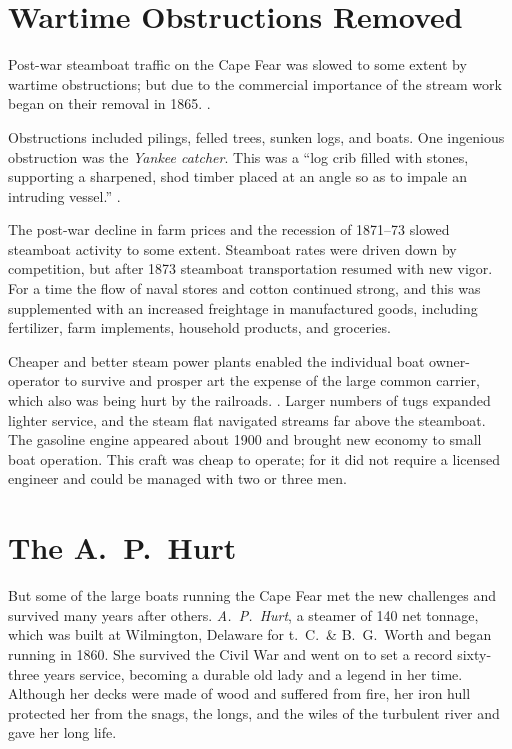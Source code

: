 \documentclass[11pt, a5paper, openright]{book}
\newcommand{\steamer}[1]{\textit{#1}\index{#1,~steamer}}
\newcommand{\steamerco}[1]{#1\index{#1}}
\begin{document}
\section{Wartime Obstructions Removed}

Post-war steamboat traffic on the Cape Fear was slowed to some extent
by wartime obstructions; but due to the commercial importance of the
stream work began on their removal in 1865.
\citep[5-2-1865]{whu}.\par

Obstructions included pilings, felled trees, sunken logs, and boats.
One ingenious obstruction was the \textit{Yankee catcher}.  This was a
``log crib filled with stones, supporting a sharpened, shod timber
placed at an angle so as to impale an intruding vessel.''
\citep[55-56]{sloanth}.\par

The post-war decline in farm prices and the recession of 1871--73
slowed steamboat activity to some extent.  Steamboat rates were driven
down by competition, but after 1873 steamboat transportation resumed
with new vigor.  For a time the flow of naval stores and cotton
continued strong, and this was supplemented with an increased
freightage in manufactured goods, including fertilizer, farm
implements, household products, and groceries.\par

Cheaper and better steam power plants enabled the individual boat
owner-operator to survive and prosper art the expense of the large
common carrier, which also was being hurt by the railroads.
\citep[65]{sloanth}.  Larger numbers of tugs expanded lighter service,
and the steam flat navigated streams far above the steamboat.  The
gasoline engine appeared about 1900 and brought new economy to small
boat operation.  This craft was cheap to operate; for it did not
require a licensed engineer and could be managed with two or three
men.\par

\section{The A.~P.~Hurt}

But some of the large boats running the Cape Fear met the new
challenges and survived many years after others.
\steamer{A.~P.~Hurt}, a steamer of 140 net tonnage, which was built at
Wilmington, Delaware for \steamerco{t.~C.~\& B.~G.~Worth} and began
running in 1860.  She survived the Civil War and went on to set a
record sixty-three years service, becoming a durable old lady and a
legend in her time.  Although her decks were made of wood and suffered
from fire, her iron hull protected her from the snags, the longs, and
the wiles of the turbulent river and gave her long life.\par
\end{document}
